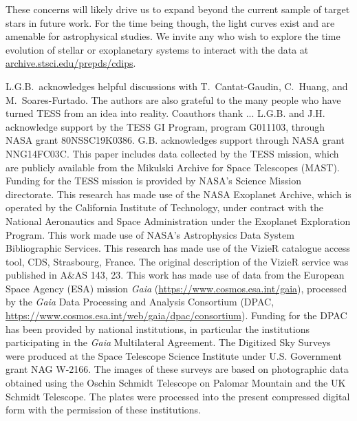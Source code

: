 \documentclass[12pt,twocolumn,tighten]{aastex62}
\newcommand{\stscilink}{\url{archive.stsci.edu/prepds/cdips}}
\begin{document}
These concerns will likely drive us to expand beyond the current
sample of target stars in future work.  For the time being though, the
light curves exist and are amenable for astrophysical studies.  We
invite any who wish to explore the time evolution of stellar or
exoplanetary systems to interact with the data at \stscilink.



\acknowledgements
L.G.B.\ acknowledges helpful discussions with 
T.~Cantat-Gaudin,
C.~Huang,
and M.~Soares-Furtado.  The authors are also
grateful to the many people who have turned TESS from an idea into
reality.
%
Coauthors thank ... %
%
L.G.B. and J.H. acknowledge support by the TESS GI Program, program
G011103, through NASA grant 80NSSC19K0386.
%
G.B. acknowledges support through NASA grant NNG14FC03C.
%
This paper includes data collected by the TESS mission, which are
publicly available from the Mikulski Archive for Space Telescopes
(MAST).
%
Funding for the TESS mission is provided by NASA's Science Mission
directorate.
%
This research has made use of the NASA Exoplanet Archive, which is
operated by the California Institute of Technology, under contract
with the National Aeronautics and Space Administration under the
Exoplanet Exploration Program.
%
This work made use of NASA's Astrophysics Data System Bibliographic
Services.
%
This research has made use of the VizieR catalogue access tool, CDS,
Strasbourg, France. The original description of the VizieR service was
published in A\&AS 143, 23.
%
This work has made use of data from the European Space Agency (ESA)
mission {\it Gaia} (\url{https://www.cosmos.esa.int/gaia}), processed
by the {\it Gaia} Data Processing and Analysis Consortium (DPAC,
\url{https://www.cosmos.esa.int/web/gaia/dpac/consortium}). Funding
for the DPAC has been provided by national institutions, in particular
the institutions participating in the {\it Gaia} Multilateral
Agreement.
%
The Digitized Sky Surveys were produced at the Space Telescope Science
Institute under U.S. Government grant NAG W-2166. The images of these
surveys are based on photographic data obtained using the Oschin
Schmidt Telescope on Palomar Mountain and the UK Schmidt Telescope.
The plates were processed into the present compressed digital form
with the permission of these institutions.
%
\newline
%
\end{document}
